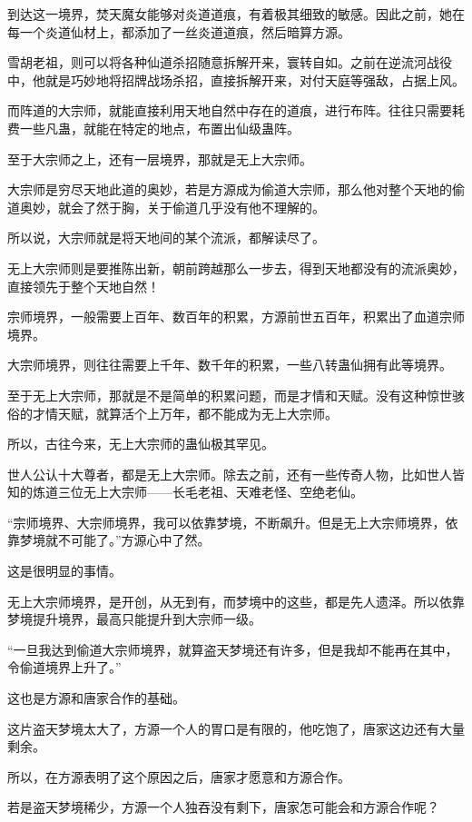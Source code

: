 \begin{this_body}
到达这一境界，焚天魔女能够对炎道道痕，有着极其细致的敏感。因此之前，她在每一个炎道仙材上，都添加了一丝炎道道痕，然后暗算方源。

雪胡老祖，则可以将各种仙道杀招随意拆解开来，寰转自如。之前在逆流河战役中，他就是巧妙地将招牌战场杀招，直接拆解开来，对付天庭等强敌，占据上风。

而阵道的大宗师，就能直接利用天地自然中存在的道痕，进行布阵。往往只需要耗费一些凡蛊，就能在特定的地点，布置出仙级蛊阵。

至于大宗师之上，还有一层境界，那就是无上大宗师。

大宗师是穷尽天地此道的奥妙，若是方源成为偷道大宗师，那么他对整个天地的偷道奥妙，就会了然于胸，关于偷道几乎没有他不理解的。

所以说，大宗师就是将天地间的某个流派，都解读尽了。

无上大宗师则是要推陈出新，朝前跨越那么一步去，得到天地都没有的流派奥妙，直接领先于整个天地自然！

宗师境界，一般需要上百年、数百年的积累，方源前世五百年，积累出了血道宗师境界。

大宗师境界，则往往需要上千年、数千年的积累，一些八转蛊仙拥有此等境界。

至于无上大宗师，那就是不是简单的积累问题，而是才情和天赋。没有这种惊世骇俗的才情天赋，就算活个上万年，都不能成为无上大宗师。

所以，古往今来，无上大宗师的蛊仙极其罕见。

世人公认十大尊者，都是无上大宗师。除去之前，还有一些传奇人物，比如世人皆知的炼道三位无上大宗师——长毛老祖、天难老怪、空绝老仙。

“宗师境界、大宗师境界，我可以依靠梦境，不断飙升。但是无上大宗师境界，依靠梦境就不可能了。”方源心中了然。

这是很明显的事情。

无上大宗师境界，是开创，从无到有，而梦境中的这些，都是先人遗泽。所以依靠梦境提升境界，最高只能提升到大宗师一级。

“一旦我达到偷道大宗师境界，就算盗天梦境还有许多，但是我却不能再在其中，令偷道境界上升了。”

这也是方源和唐家合作的基础。

这片盗天梦境太大了，方源一个人的胃口是有限的，他吃饱了，唐家这边还有大量剩余。

所以，在方源表明了这个原因之后，唐家才愿意和方源合作。

若是盗天梦境稀少，方源一个人独吞没有剩下，唐家怎可能会和方源合作呢？


\end{this_body}

